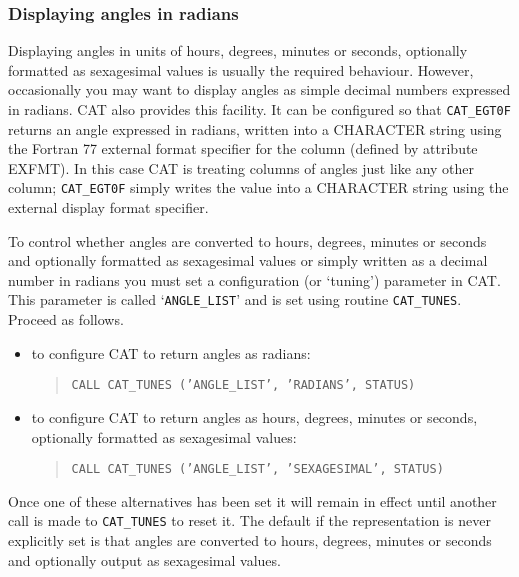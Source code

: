 \subsubsection{Displaying angles in radians}

Displaying angles in units of hours, degrees, minutes or seconds,
optionally formatted as sexagesimal values is usually the required
behaviour. However, occasionally you may want to display angles as
simple decimal numbers expressed in radians. CAT also provides this
facility. It can be configured so that {\tt CAT\_EGT0F} returns an
angle expressed in radians, written into a CHARACTER string using
the Fortran 77 external format specifier for the column (defined by
attribute EXFMT). In this case CAT is treating columns of angles
just like any other column; {\tt CAT\_EGT0F} simply writes the
value into a CHARACTER string using the external display format
specifier.

To control whether angles are converted to hours, degrees, minutes or
seconds and optionally formatted as sexagesimal values or simply written
as a decimal number in radians you must set a configuration (or
`tuning') parameter in CAT. This parameter is called `{\tt ANGLE\_LIST}'
and is set using routine {\tt CAT\_TUNES}. Proceed as follows.

\begin{itemize}

  \item to configure CAT to return angles as radians:

  \begin{verse}
   {\tt CALL CAT\_TUNES ('ANGLE\_LIST', 'RADIANS', STATUS)}
  \end{verse}

  \item to configure CAT to return angles as hours, degrees, minutes
   or seconds, optionally formatted as sexagesimal values:

  \begin{verse}
   {\tt CALL CAT\_TUNES ('ANGLE\_LIST', 'SEXAGESIMAL', STATUS)}
  \end{verse}

\end{itemize}

Once one of these alternatives has been set it will remain in
effect until another call is made to {\tt CAT\_TUNES} to reset
it. The default if the representation is never explicitly set is
that angles are converted to hours, degrees, minutes or seconds and
optionally output as sexagesimal values.

